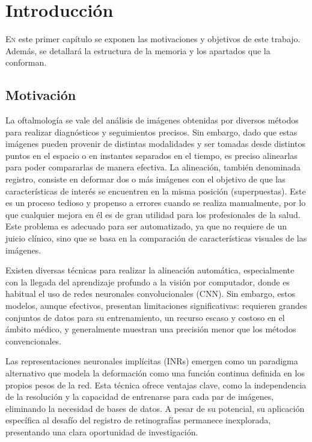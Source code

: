 \chapter{Introducción}
\label{chap:introducion}

\lettrine{E} n este primer capítulo se exponen las motivaciones y objetivos de este trabajo. Además, se detallará la estructura de la memoria y los apartados que la conforman.

\section{Motivación}
\label{sec:motivacion}

La oftalmología se vale del análisis de imágenes obtenidas por diversos métodos para realizar diagnósticos y seguimientos precisos. Sin embargo, dado que estas imágenes pueden provenir de distintas modalidades y ser tomadas desde distintos puntos en el espacio o en instantes separados en el tiempo, es preciso alinearlas para poder compararlas de manera efectiva. La alineación, también denominada registro, consiste en deformar dos o más imágenes con el objetivo de que las características de interés se encuentren en la misma posición (superpuestas). Este es un proceso tedioso y propenso a errores cuando se realiza manualmente, por lo que cualquier mejora en él es de gran utilidad para los profesionales de la salud. Este problema es adecuado para ser automatizado, ya que no requiere de un juicio clínico, sino que se basa en la comparación de características visuales de las imágenes.

Existen diversas técnicas para realizar la alineación automática, especialmente con la llegada del aprendizaje profundo a la visión por computador, donde es habitual el uso de redes neuronales convolucionales (CNN). Sin embargo, estos modelos, aunque efectivos, presentan limitaciones significativas: requieren grandes conjuntos de datos para su entrenamiento, un recurso escaso y costoso en el ámbito médico, y generalmente muestran una precisión menor que los métodos convencionales.

Las representaciones neuronales implícitas (INRs) emergen como un paradigma alternativo que modela la deformación como una función continua definida en los propios pesos de la red. Esta técnica ofrece ventajas clave, como la independencia de la resolución y la capacidad de entrenarse para cada par de imágenes, eliminando la necesidad de bases de datos. A pesar de su potencial, su aplicación específica al desafío del registro de retinografías permanece inexplorada, presentando una clara oportunidad de investigación.


